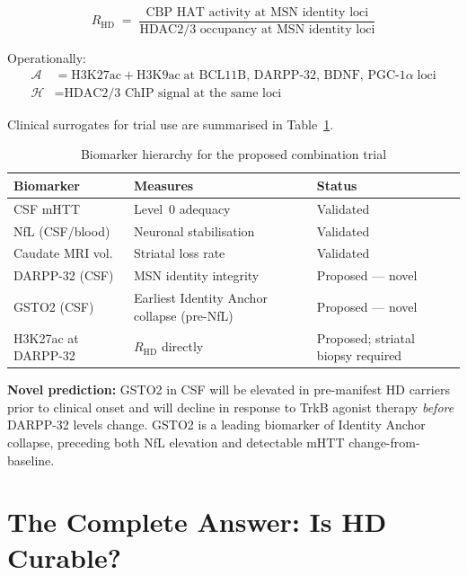 \documentclass[12pt,a4paper]{article}
\newcommand{\RHD}{R_{\mathrm{HD}}}
\newcommand{\IA}{\mathcal{A}}
\newcommand{\Hub}{\mathcal{H}}
\begin{document}
\begin{equation}
  \RHD \;=\;
  \frac{
    \text{CBP HAT activity at MSN identity loci}
  }{
    \text{HDAC2/3 occupancy at MSN identity loci}
  }
  \label{eq:RHD}
\end{equation}

Operationally:
\begin{align}
  \IA &= \mathrm{H3K27ac} + \mathrm{H3K9ac}
      \;\text{at BCL11B, DARPP-32, BDNF, PGC-1}\alpha
      \;\text{loci}
      \label{eq:A_op}\\
  \Hub &= \text{HDAC2/3 ChIP signal at the same loci}
      \label{eq:H_op}
\end{align}

Clinical surrogates for trial use are summarised in
Table~\ref{tab:biomarkers}.

\begin{table}[ht!]
\centering
\caption{Biomarker hierarchy for the proposed combination
  trial}
\label{tab:biomarkers}
\begin{tabular}{p{3.2cm}p{3.5cm}p{4.8cm}}
\toprule
\textbf{Biomarker} &
\textbf{Measures} &
\textbf{Status} \\
\midrule
CSF mHTT &
Level~0 adequacy &
Validated~\cite{AMT130_2025,WVE003_2024} \\[3pt]
NfL (CSF/blood) &
Neuronal stabilisation &
Validated~\cite{AMT130_2025} \\[3pt]
Caudate MRI vol. &
Striatal loss rate &
Validated~\cite{WVE003_2024} \\[3pt]
DARPP-32 (CSF) &
MSN identity integrity &
Proposed --- novel \\[3pt]
GSTO2 (CSF) &
Earliest Identity Anchor
collapse (pre-NfL) &
Proposed --- novel \\[3pt]
H3K27ac at DARPP-32 &
$\RHD$ directly &
Proposed; striatal
biopsy required \\
\bottomrule
\end{tabular}
\end{table}

\textbf{Novel prediction:} GSTO2 in CSF will be elevated
in pre-manifest HD carriers prior to clinical onset and
will decline in response to TrkB agonist therapy
\emph{before} DARPP-32 levels change. GSTO2 is a leading
biomarker of Identity Anchor collapse, preceding both NfL
elevation and detectable mHTT change-from-baseline.

\section{The Complete Answer: Is HD Curable?}
\end{document}
